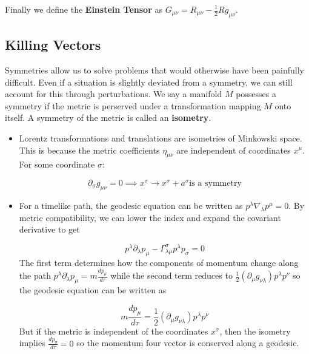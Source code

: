 \documentclass[11pt]{article}
\begin{document}
\noindent Finally we define the \textbf{Einstein Tensor} as \( G_{\mu\nu}  = R_{\mu\nu} - \frac{1}{2}Rg_{\mu\nu} \). 

\subsection{Killing Vectors}
Symmetries allow us to solve problems that would otherwise have been painfully difficult. Even if a situation is slightly deviated from a symmetry, we can still account for this through perturbations. We say a manifold \( M \) possesses a symmetry if the metric is perserved under a transformation
mapping \( M \) onto itself. A symmetry of the metric is called an \textbf{isometry}.

\begin{itemize}
    \item Lorentz transformations and translations are isometries of Minkowski space. This is because the metric coefficients \( \eta_{\mu\nu} \) are independent of coordinates \( x^{\mu} \). For some coordinate \( \sigma \):
    
    \[ 
        \partial_{\sigma}g_{\mu\nu} = 0 \implies x^{\sigma} \rightarrow x^{\sigma} + a^{\sigma} \text{is a symmetry} 
    \]    

    \item For a timelike path, the geodesic equation can be written as \( p^{\lambda}\nabla_{\lambda}p^{\mu} = 0 \). By metric compatibility, we can lower the index and expand the covariant derivative to get
    
    \[ 
        p^{\lambda}\partial_{\lambda}p_{\mu} - \Gamma^{\sigma}_{\lambda\mu}p^{\lambda}p_{\sigma} = 0 
    \]
    The first term determines how the components of momentum change along the path \( p^{\lambda}\partial_{\lambda}p_{\mu} = m\frac{dp_{\mu}}{d\tau} \) while the second term reduces to
    \( \frac{1}{2}(\partial_{\mu} g_{\nu\lambda})p^{\lambda}p^{\nu} \) so the geodesic equation can be written as 
    
    \[ 
         m\frac{dp_{\mu}}{d\tau} = \frac{1}{2}(\partial_{\mu} g_{\nu\lambda})p^{\lambda}p^{\nu}
    \]
    But if the metric is independent of the coordinates \( x^{\sigma} \), then the isometry implies \( \frac{dp_{\sigma}}{d\tau} = 0 \) so the momentum four vector is conserved along a geodesic. 

\end{itemize}
\end{document}
